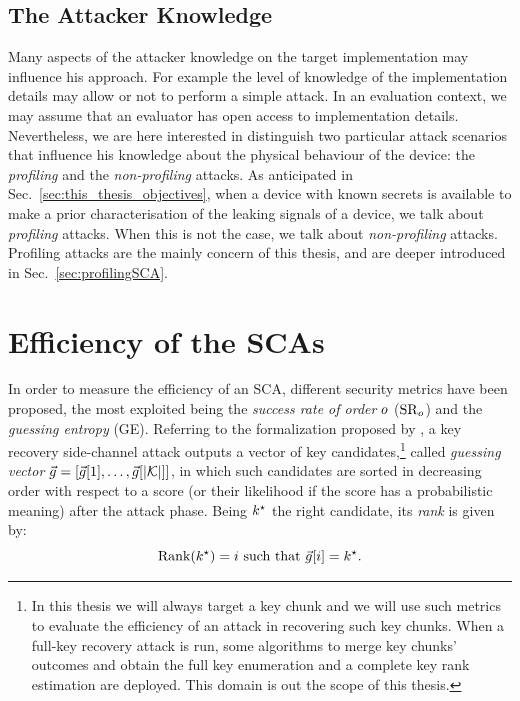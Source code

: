 \subsection{The Attacker Knowledge}
Many aspects of the attacker knowledge on the target implementation may influence his approach. For example the level of knowledge of the implementation details may allow or not to perform a simple attack. In an evaluation context, we may assume that an evaluator has open access to implementation details. Nevertheless, we are here interested in distinguish two particular attack scenarios that influence his knowledge about the physical behaviour of the device: the \emph{profiling} and the \emph{non-profiling} attacks.
As anticipated in Sec.~\ref{sec:this_thesis_objectives}, when a device with known secrets is available to make a prior characterisation of the leaking signals of a device, we talk about \emph{profiling} attacks. When this is not the case, we talk about \emph{non-profiling} attacks. Profiling attacks are the mainly concern of this thesis, and are deeper introduced in Sec.~\ref{sec:profilingSCA}. \\


\section{Efficiency of the SCAs}\label{sec:metrics}
In order to measure the efficiency of an SCA, different security metrics have been proposed, the most exploited being the \emph{success rate of order} $o$ ($\mathrm{SR}_o$) and the \emph{guessing entropy} (GE). Referring to the formalization proposed by \cite{unifiedFramework}, a key recovery side-channel attack outputs a vector of key candidates,\footnote{In this thesis we will always target a key chunk and we will use such metrics to evaluate the efficiency of an attack in recovering such key chunks. When a full-key recovery attack is run, some algorithms to merge key chunks' outcomes and obtain the full key enumeration and a complete key rank estimation are deployed. This domain is out the scope of this thesis.} called {\em guessing vector} $\vec{g} = \left[\vec{g}[1], \dots, \vec{g}[{\lvert \mathcal{K} \rvert}]\right]$, in which such candidates are sorted in decreasing order with respect to a score (or their likelihood if the score has a probabilistic meaning) after the attack phase. Being $k^\star$ the right candidate, its \emph{rank} is given by:
\begin{equation}
\mathrm{Rank}(k^\star) = i \mbox{ such that } \vec{g}[i] = k^\star \mbox{.}
\end{equation}


